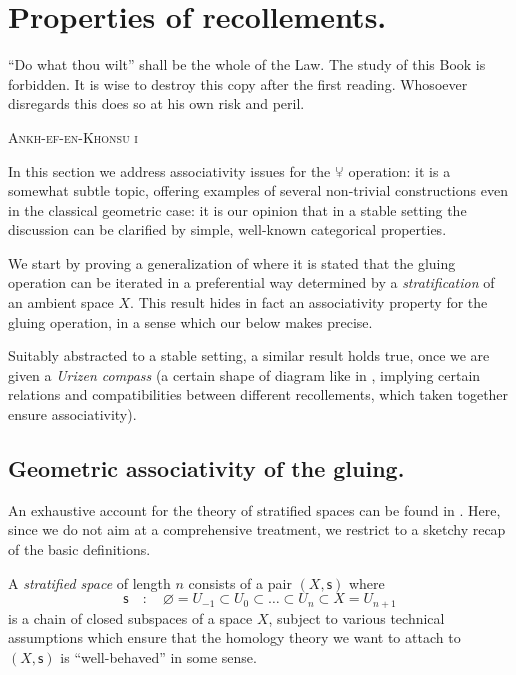 \section{Properties of recollements.}\label{properties}
\setlength{\epigraphwidth}{.75\textwidth}
\epigraph{
``Do what thou wilt'' shall be the whole of the Law.
The study of this Book is forbidden. It is wise to destroy this copy after the first reading.
Whosoever disregards this does so at his own risk and peril.}{\textsc{Ankh-ef-en-Khonsu i}}
\setlength{\epigraphwidth}{\DefaultEpigraphWidth}
In this section we address associativity issues for the $\glue$ operation: it is a somewhat subtle topic, offering examples of several non\hyp{}trivial constructions even in the classical geometric case: it is our opinion that in a stable setting the discussion can be clarified by simple, well\hyp{}known categorical properties. 

We start by proving a generalization of \cite{Banagl,BBDPervers} where it is stated that the gluing operation can be iterated in a preferential way determined by a \emph{stratification} of an ambient space $X$. This result hides in fact an associativity property for the gluing operation, in a sense which our  below makes precise. 

Suitably abstracted to a stable setting, a similar result holds true, once we are given a \emph{Urizen compass} (a certain shape of diagram like in  , implying certain relations and compatibilities between different recollements, which taken together ensure associativity).
\subsection{Geometric associativity of the gluing.}
An exhaustive account for the theory of stratified spaces can be found in \cite{pflaum2001analytic,Banagl,Wein}. Here, since we do not aim at a comprehensive treatment, we restrict to a sketchy recap of the basic definitions.

A \emph{stratified space} of length $n$ consists of a pair $(X, \textsf{s})$ where 
\[\label{stratas}
\textsf{s} \quad : \quad \varnothing = U_{-1} \subset U_0\subset \dots\subset U_n\subset X = U_{n+1}
\] 
is a chain of closed subspaces of a space $X$, subject to various technical assumptions which ensure that the homology theory we want to attach to $(X, \mathsf{s})$ is ``well\hyp{}behaved'' in some sense.

